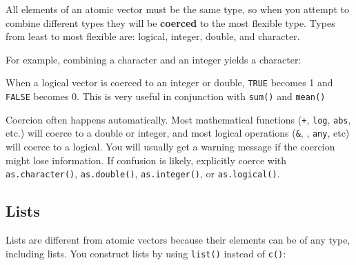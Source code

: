 All elements of an atomic vector must be the same type, so when you
attempt to combine different types they will be \textbf{coerced} to the
most flexible type. Types from least to most flexible are: logical,
integer, double, and character. 

For example, combining a character and an integer yields a character:

\begin{Shaded}
\begin{Highlighting}[]
\NormalTok{(}\NormalTok{(}\NormalTok{, }\NormalTok{))}
\end{Highlighting}
\end{Shaded}

When a logical vector is coerced to an integer or double, \texttt{TRUE}
becomes 1 and \texttt{FALSE} becomes 0. This is very useful in
conjunction with \texttt{sum()} and \texttt{mean()}

\begin{Shaded}
\begin{Highlighting}[]
\StringTok{ }\NormalTok{(}\NormalTok{, }\NormalTok{, }\NormalTok{)}


\end{Highlighting}
\end{Shaded}

Coercion often happens automatically. Most mathematical functions
(\texttt{+}, \texttt{log}, \texttt{abs}, etc.) will coerce to a double
or integer, and most logical operations (\texttt{\&},
\texttt{\textbar{}}, \texttt{any}, etc) will coerce to a logical. You
will usually get a warning message if the coercion might lose
information. If confusion is likely, explicitly coerce with
\texttt{as.character()}, \texttt{as.double()}, \texttt{as.integer()}, or
\texttt{as.logical()}.

\subsection{Lists}

Lists are different from atomic vectors because their elements can be of
any type, including lists. You construct lists by using \texttt{list()}
instead of \texttt{c()}:  

